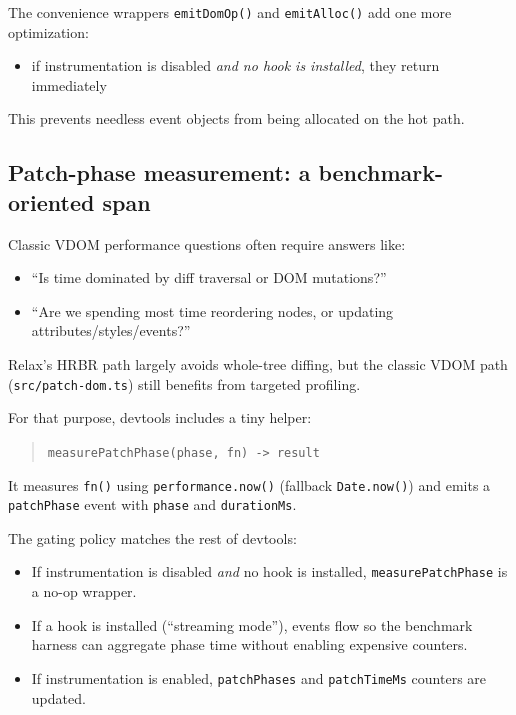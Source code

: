 The convenience wrappers \texttt{emitDomOp()} and \texttt{emitAlloc()} add one more optimization:

\begin{itemize}
\item if instrumentation is disabled \emph{and no hook is installed}, they return immediately
\end{itemize}

This prevents needless event objects from being allocated on the hot path.

\subsection{Patch-phase measurement: a benchmark-oriented span}

Classic VDOM performance questions often require answers like:

\begin{itemize}
\item ``Is time dominated by diff traversal or DOM mutations?''
\item ``Are we spending most time reordering nodes, or updating attributes/styles/events?''
\end{itemize}

Relax's HRBR path largely avoids whole-tree diffing, but the classic VDOM path (\texttt{src/patch-dom.ts}) still benefits from targeted profiling.

For that purpose, devtools includes a tiny helper:

\begin{quote}
	\texttt{measurePatchPhase(phase, fn) -> result}
\end{quote}

It measures \texttt{fn()} using \texttt{performance.now()} (fallback \texttt{Date.now()}) and emits a \texttt{patchPhase} event with \texttt{phase} and \texttt{durationMs}.

The gating policy matches the rest of devtools:

\begin{itemize}
\item If instrumentation is disabled \emph{and} no hook is installed, \texttt{measurePatchPhase} is a no-op wrapper.
\item If a hook is installed (``streaming mode''), events flow so the benchmark harness can aggregate phase time without enabling expensive counters.
\item If instrumentation is enabled, \texttt{patchPhases} and \texttt{patchTimeMs} counters are updated.
\end{itemize}

